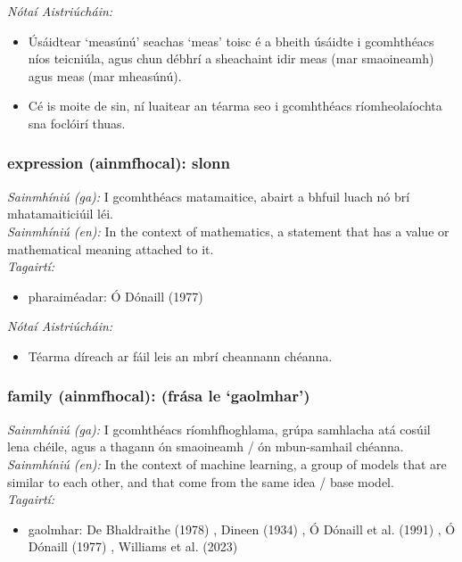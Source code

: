  \noindent \textit{Nótaí Aistriúcháin:}
\begin{itemize}
	\item Úsáidtear `measúnú' seachas `meas' toisc é a bheith úsáidte i gcomhthéacs níos teicniúla, agus chun débhrí a sheachaint idir meas (mar smaoineamh) agus meas (mar mheasúnú).
	\item Cé is moite de sin, ní luaitear an téarma seo i gcomhthéacs ríomheolaíochta sna foclóirí thuas.
\end{itemize}


\subsubsection*{expression (ainmfhocal): slonn}
 \noindent \textit{Sainmhíniú (ga):} I gcomhthéacs matamaitice, abairt a bhfuil luach nó brí mhatamaiticiúil léi.
\\
 \noindent \textit{Sainmhíniú (en):} In the context of mathematics, a statement that has a value or mathematical meaning attached to it.
\\
 \noindent \textit{Tagairtí:}
\begin{itemize}
	\item pharaiméadar: Ó Dónaill (1977) \cite{odonaill}
\end{itemize}

 \noindent \textit{Nótaí Aistriúcháin:}
\begin{itemize}
	\item Téarma díreach ar fáil leis an mbrí cheannann chéanna.
\end{itemize}


\subsubsection*{family (ainmfhocal): (frása le `gaolmhar')}
 \noindent \textit{Sainmhíniú (ga):} I gcomhthéacs ríomhfhoghlama, grúpa samhlacha atá cosúil lena chéile, agus a thagann ón smaoineamh / ón mbun-samhail chéanna.
\\
 \noindent \textit{Sainmhíniú (en):} In the context of machine learning, a group of models that are similar to each other, and that come from the same idea / base model.
\\
 \noindent \textit{Tagairtí:}
\begin{itemize}
	\item gaolmhar: De Bhaldraithe (1978) \cite{de-bhaldraithe}, Dineen (1934) \cite{dineen}, Ó Dónaill et al. (1991) \cite{focloir-beag}, Ó Dónaill (1977) \cite{odonaill}, Williams et al. (2023) \cite{storchiste}
\end{itemize}

